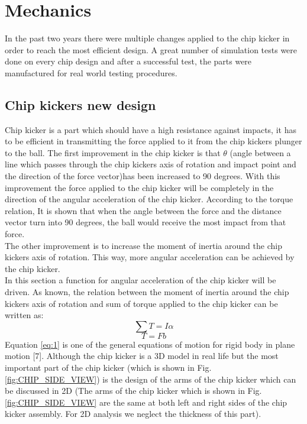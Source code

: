 \section{Mechanics}
\setlength\intextsep{0pt}
In the past two years there were multiple changes applied to the chip kicker in order to reach the most efficient design. A great number of simulation tests were done on every chip design and after a successful test, the parts were manufactured for real world testing procedures.

\subsection{Chip kickers new design}
Chip kicker is a part which should have a high resistance against impacts, it has to be efficient in transmitting the force applied to it from the chip kickers plunger to the ball. The first improvement in the chip kicker is that $\theta$ (angle between a line which passes through the chip kickers axis of rotation and impact point and the direction of the force vector)has been increased to 90 degrees. With this improvement the force applied to the chip kicker will be completely in the direction of the angular acceleration of the chip kicker. According to the torque relation, It is shown that when the angle between the force and the distance vector turn into 90 degrees, the ball would receive the most impact from that force.\\
\indent The other improvement is to increase the moment of inertia around the chip kickers axis of rotation. This way, more angular acceleration can be achieved by the chip kicker.\\
\indent In this section a function for angular acceleration of the chip kicker will be driven. As known, the relation between the moment of inertia around the chip kickers axis of rotation and sum of torque applied to the chip kicker can be written as:
\begin{equation} 
\label{eq:1}
\sum T=I\alpha
\end{equation}
\begin{equation}
\label{eq:2}
T=Fb
\end{equation}
Equation \ref{eq:1} is one of the general equations of motion for rigid body in plane motion [7]. Although the chip kicker is a 3D model in real life but the most important part of the chip kicker (which is shown in Fig.\ref{fig:CHIP_SIDE_VIEW}) is the design of the arms of the chip kicker which can be discussed in 2D (The arms of the chip kicker which is shown in Fig.\ref{fig:CHIP_SIDE_VIEW} are the same at both left and right sides of the chip kicker assembly. For 2D analysis we neglect the thickness of this part).\\
